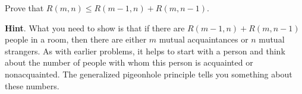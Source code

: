 \documentclass{book}
\begin{document}
\setcounter{cpjt}{52}
\addtocounter{cpjt}{-1}
\begin{activity}\label{Ramseyrecurrence}
\hypertarget{p-419}{}%
Prove that \(R(m,n)\le R(m-1,n) + R(m,n-1)\).%
\par\smallskip%
\noindent\textbf{Hint}.\hypertarget{hint-22}{}\quad%
\hypertarget{p-420}{}%
What you need to show is that if there are \(R(m - 1, n) + R(m, n - 1)\) people in a room, then there are either \(m\) mutual acquaintances or \(n\) mutual strangers. As with earlier problems, it helps to start with a person and think about the number of people with whom this person is acquainted or nonacquainted. The generalized pigeonhole principle tells you something about these numbers.%
\par\smallskip%
\noindent\end{activity}

\clearpage
\end{document}
